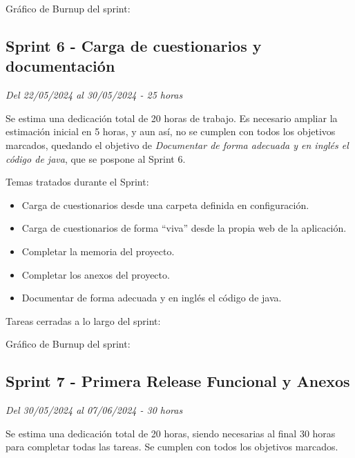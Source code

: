 Gráfico de Burnup del sprint:


\clearpage
\subsection{Sprint 6 - Carga de cuestionarios y documentación}
\textit{Del 22/05/2024 al 30/05/2024 - 25 horas}

Se estima una dedicación total de 20 horas de trabajo.
Es necesario ampliar la estimación inicial en 5 horas, y aun así, no se cumplen con todos los objetivos marcados, quedando el objetivo de \textit{Documentar de forma adecuada y en inglés el código de java}, que se pospone al Sprint 6.

Temas tratados durante el Sprint:
\begin{itemize}
	\item
	Carga de cuestionarios desde una carpeta definida en configuración.
	\item
	Carga de cuestionarios de forma ``viva'' desde la propia web de la aplicación.
	\item
	Completar la memoria del proyecto.
	\item
	Completar los anexos del proyecto.
	\item
	Documentar de forma adecuada y en inglés el código de java.
\end{itemize}
\clearpage
Tareas cerradas a lo largo del sprint:

Gráfico de Burnup del sprint:

\clearpage
\subsection{Sprint 7 - Primera Release Funcional y Anexos}
\textit{Del 30/05/2024 al 07/06/2024 - 30 horas} 

Se estima una dedicación total de 20 horas, siendo necesarias al final 30 horas para completar todas las tareas.
Se cumplen con todos los objetivos marcados.

